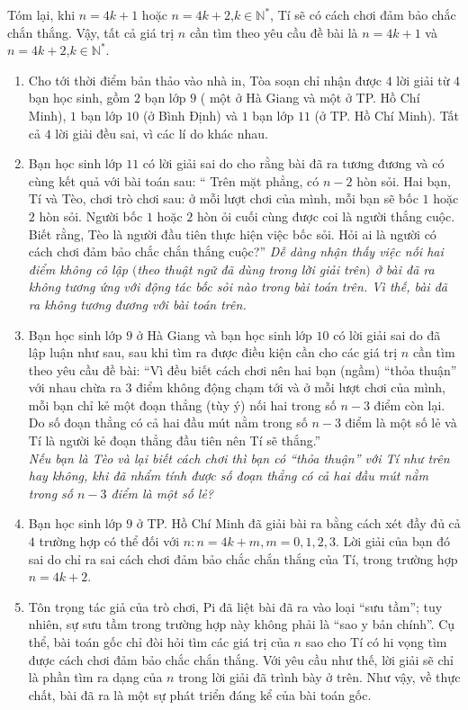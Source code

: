 \begin{bt}
{\begin{itemize}
\end{itemize}
Tóm lại, khi $n=4k+1$ hoặc $n=4k+2$,$k \in \mathbb{N^*}$, Tí sẽ có cách chơi đảm bảo chắc chắn thắng.
Vậy, tất cả giá trị $n$ cần tìm theo yêu cầu đề bài là $n=4k+1$ và $n=4k+2$,$k\in \mathbb{N^*}$.
	\begin{nx}\hfill
			\begin{enumerate}[1.]
				\item Cho tới thời điểm bản thảo vào nhà in, Tòa soạn chỉ nhận được $4$ lời giải từ $4$ bạn học sinh, gồm $2$ bạn lớp $9$ ( một ở Hà Giang và một ở TP. Hồ Chí Minh), $1$ bạn lớp $10$ (ở Bình Định) và $1$ bạn lớp $11$ (ở TP. Hồ Chí Minh). Tất cả $4$ lời giải đều sai, vì các lí do khác nhau.
				\item Bạn học sinh lớp $11$ có lời giải sai do cho rằng bài đã ra tương đương và có cùng kết quả với bài toán sau:
				`` Trên mặt phẳng, có $n-2$ hòn sỏi. Hai bạn, Tí và Tèo, chơi trò chơi sau: ở mỗi lượt chơi của mình, mỗi bạn sẽ bốc $1$ hoặc $2$ hòn sỏi. Người bốc $1$ hoặc $2$ hòn ỏi cuối cùng được coi là người thắng cuộc. Biết rằng, Tèo là người đầu tiên thực hiện việc bốc sỏi. Hỏi ai là người có cách chơi đảm bảo chắc chắn thắng cuộc?'' 
				\textit{Dễ dàng nhận thấy việc nối hai điểm không cô lập $($theo thuật ngữ đã dùng trong lời giải trên$)$ ở bài đã ra không tương ứng với động tác bốc sỏi nào trong bài toán trên. Vì thế, bài đã ra không tương đương với bài toán trên.}
				\item Bạn học sinh lớp $9$ ở Hà Giang và bạn học sinh lớp $10$ có lời giải sai do đã lập luận như sau, sau khi tìm ra được điều kiện cần cho các giá trị $n$ cần tìm theo yêu cầu đề bài:
				``Vì đều biết cách chơi nên hai bạn (ngầm) ``thỏa thuận'' với nhau chừa ra $3$ điểm không động chạm tới và ở mỗi lượt chơi của mình, mỗi bạn chỉ kẻ một đoạn thẳng (tùy ý) nối hai trong số $n-3$ điểm còn lại. Do số đoạn thẳng có cả hai đầu mút nằm trong số $n-3$ điểm là một số lẻ và Tí là người kẻ đoạn thẳng đầu tiên nên Tí sẽ thắng.''\\
				\textit{Nếu bạn là Tèo và lại biết cách chơi thì bạn có ``thỏa thuận'' với Tí như trên hay không, khi đã nhẩm tính được số đoạn thẳng có cả hai đầu mút nằm trong số $n-3$ điểm là một số lẻ?}
				\item Bạn học sinh lớp $9$ ở TP. Hồ Chí Minh đã giải bài ra bằng cách xét đầy đủ cả $4$ trường hợp có thể đối với $n:n=4k+m,m=0,1,2,3$. Lời giải của bạn đó sai do chỉ ra sai cách chơi đảm bảo chắc chắn thắng của Tí, trong trường hợp $n=4k+2$.
				\item Tôn trọng tác giả của trò chơi, Pi đã liệt bài đã ra vào loại ``sưu tầm''; tuy nhiên, sự sưu tầm trong trường hợp này không phải là ``sao y bản chính''. Cụ thể, bài toán gốc chỉ đòi hỏi tìm các giá trị của $n$ sao cho Tí có hi vọng tìm được cách chơi đảm bảo chắc chắn thắng. Với yêu cầu như thế, lời giải sẽ chỉ là phần tìm ra dạng của $n$ trong lời giải đã trình bày ở trên. Như vậy, về thực chất, bài đã ra là một sự phát triển đáng kể của bài toán gốc.
			\end{enumerate}
			\begin{flushright}
				

\end{flushright}
\end{nx}}
\end{bt}
